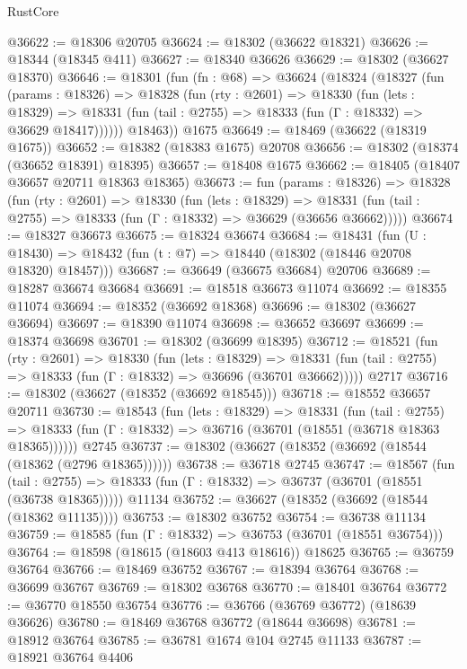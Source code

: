 \begin{lexlean}{RustCore}
\begin{coremodule}
@36622 := @18306 @20705
@36624 := @18302 (@36622 @18321)
@36626 := @18344 (@18345 @411)
@36627 := @18340 @36626
@36629 := @18302 (@36627 @18370)
@36646 := @18301
    (fun (fn : @68) =>
    @36624
      (@18324
        (@18327
          (fun (params : @18326) =>
          @18328
            (fun (rty : @2601) =>
            @18330
              (fun (lets : @18329) =>
              @18331 (fun (tail : @2755) => @18333 (fun (Γ : @18332) => @36629 @18417))))))
        @18463))
    @1675
@36649 := @18469 (@36622 (@18319 @1675))
@36652 := @18382 (@18383 @1675) @20708
@36656 := @18302 (@18374 (@36652 @18391) @18395)
@36657 := @18408 @1675
@36662 := @18405 (@18407 @36657 @20711 @18363 @18365)
@36673 := fun (params : @18326) =>
  @18328
    (fun (rty : @2601) =>
    @18330
      (fun (lets : @18329) =>
      @18331 (fun (tail : @2755) => @18333 (fun (Γ : @18332) => @36629 (@36656 @36662)))))
@36674 := @18327 @36673
@36675 := @18324 @36674
@36684 := @18431
    (fun (U : @18430) => @18432 (fun (t : @7) => @18440 (@18302 (@18446 @20708 @18320) @18457)))
@36687 := @36649 (@36675 @36684) @20706
@36689 := @18287 @36674 @36684
@36691 := @18518 @36673 @11074
@36692 := @18355 @11074
@36694 := @18352 (@36692 @18368)
@36696 := @18302 (@36627 @36694)
@36697 := @18390 @11074
@36698 := @36652 @36697
@36699 := @18374 @36698
@36701 := @18302 (@36699 @18395)
@36712 := @18521
    (fun (rty : @2601) =>
    @18330
      (fun (lets : @18329) =>
      @18331 (fun (tail : @2755) => @18333 (fun (Γ : @18332) => @36696 (@36701 @36662)))))
    @2717
@36716 := @18302 (@36627 (@18352 (@36692 @18545)))
@36718 := @18552 @36657 @20711
@36730 := @18543
    (fun (lets : @18329) =>
    @18331
      (fun (tail : @2755) =>
      @18333 (fun (Γ : @18332) => @36716 (@36701 (@18551 (@36718 @18363 @18365))))))
    @2745
@36737 := @18302 (@36627 (@18352 (@36692 (@18544 (@18362 (@2796 @18365))))))
@36738 := @36718 @2745
@36747 := @18567
    (fun (tail : @2755) => @18333 (fun (Γ : @18332) => @36737 (@36701 (@18551 (@36738 @18365)))))
    @11134
@36752 := @36627 (@18352 (@36692 (@18544 (@18362 @11135))))
@36753 := @18302 @36752
@36754 := @36738 @11134
@36759 := @18585 (fun (Γ : @18332) => @36753 (@36701 (@18551 @36754)))
@36764 := @18598 (@18615 (@18603 @413 @18616)) @18625
@36765 := @36759 @36764
@36766 := @18469 @36752
@36767 := @18394 @36764
@36768 := @36699 @36767
@36769 := @18302 @36768
@36770 := @18401 @36764
@36772 := @36770 @18550 @36754
@36776 := @36766 (@36769 @36772) (@18639 @36626)
@36780 := @18469 @36768 @36772 (@18644 @36698)
@36781 := @18912 @36764
@36785 := @36781 @1674 @104 @2745 @11133
@36787 := @18921 @36764 @4406

\end{coremodule}
\end{lexlean}
